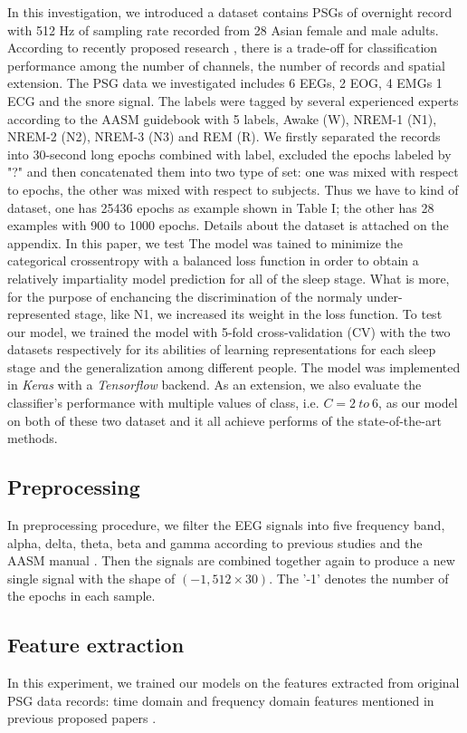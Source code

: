 \documentclass[journal]{IEEEtran}
\begin{document}
In this investigation, we introduced a dataset contains PSGs of overnight record with 512 Hz of sampling rate recorded from 28 Asian female and male adults. According to recently proposed research \cite{chambon2017deep}, there is a trade-off for classification performance among the number of channels, the number of records and spatial extension. The PSG data we investigated includes 6 EEGs, 2 EOG, 4 EMGs 1 ECG and the snore signal. The labels were tagged by several experienced experts according to the AASM guidebook with 5 labels, Awake (W), NREM-1 (N1), NREM-2 (N2), NREM-3 (N3) and REM (R). We firstly separated the records into 30-second long epochs combined with label, excluded the epochs labeled by "?" and then concatenated them into two type of set: one was mixed with respect to epochs, the other was mixed with respect to subjects. Thus we have to kind of dataset, one has 25436 epochs as example shown in Table I; the other has 28 examples with 900 to 1000 epochs. Details about the dataset is attached on the appendix. In this paper, we test
The model was tained to minimize the categorical crossentropy with a balanced loss function in order to obtain a relatively impartiality model prediction for all of the sleep stage. What is more, for the purpose of enchancing the discrimination of the normaly under-represented stage, like N1, we increased its weight in the loss function. To test our model, we trained the model with 5-fold cross-validation (CV) with the two datasets respectively for its abilities of learning representations for each sleep stage and the generalization among different people. The model was implemented in \emph{Keras} with a \emph{Tensorflow} backend. As an extension, we also evaluate the classifier's performance with multiple values of class, i.e. $C = 2\ to\ 6$, as our model on both of these two dataset and it all achieve performs of the state-of-the-art methods.

\subsection{Preprocessing}
In preprocessing procedure, we filter the EEG signals into five frequency band, alpha, delta, theta, beta and gamma according to previous studies and the AASM manual \cite{ronzhina2012sleep,ebrahimi2008automatic,berry2012aasm}. Then the signals are combined together again to produce a new single signal with the shape of $(-1, 512\times30)$. The '-1' denotes the number of the epochs in each sample.
\subsection{Feature extraction}
In this experiment, we trained our models on the features extracted from original PSG data records: time domain and frequency domain features mentioned in previous proposed papers \cite{ronzhina2012sleep,ebrahimi2008automatic,chapotot2010automated}.
\end{document}
